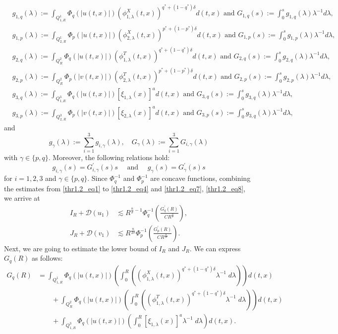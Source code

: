 \documentclass[11pt,reqno]{amsart}
\newcommand{\tron}[1]{\left( #1 \right)}
\numberwithin{equation}{section}
\begin{document}
\begin{align*}
    &g_{1,q}(\lambda):=\int_{Q^1_{1,R}} \Phi_q(|u(t,x)|)\left(\phi^{X}_{1,\lambda}(t,x)\right)^{q^*+(1-q^*)\delta}d(t,x)\text{ and }G_{1,q}(s):=\int_0^s g_{1,q}(\lambda)\lambda^{-1} d \lambda,\\
    &g_{1,p}(\lambda):=\int_{Q^1_{2,R}} \Phi_p(|u(t,x)|)\left(\phi^{X}_{2,\lambda}(t,x)\right)^{p^*+(1-p^*)\delta}d(t,x)\text{ and }G_{1,p}(s):=\int_0^s g_{1,p}(\lambda)\lambda^{-1} d \lambda,\\
    &g_{2,q}(\lambda):=\int_{Q^2_{R}} \Phi_q(|u(t,x)|)\left(\phi^{T}_{1,\lambda}(t,x)\right)^{q^*+(1-q^*)\delta}d(t,x)\text{ and }G_{2,q}(s):=\int_0^s g_{2,q}(\lambda)\lambda^{-1} d \lambda,\\
    &g_{2,p}(\lambda):=\int_{Q^2_{R}} \Phi_p(|v(t,x)|)\left(\phi^{T}_{2,\lambda}(t,x)\right)^{p^*+(1-p^*)\delta}d(t,x)\text{ and }G_{2,p}(s):=\int_0^s g_{2,p}(\lambda)\lambda^{-1} d \lambda,\\
    &g_{3,q}(\lambda):=\int_{Q^3_{1,R}} \Phi_q(|u(t,x)|)[\xi_{1,\lambda}(x)]^{a}d(t,x)\text{ and }G_{3,q}(s):=\int_0^s g_{3,q}(\lambda)\lambda^{-1} d \lambda,\\
    &g_{3,p}(\lambda):=\int_{Q^3_{2,R}} \Phi_p(|v(t,x)|)[\xi_{2,\lambda}(x)]^{a}d(t,x)\text{ and }G_{3,p}(s):=\int_0^s g_{3,q}(\lambda)\lambda^{-1} d \lambda,
\end{align*}
and
\[
g_\gamma(\lambda):=\sum_{i=1}^{3}g_{i,\gamma}(\lambda),\quad G_\gamma(\lambda):=\sum_{i=1}^{3}G_{i,\gamma}(\lambda)
\]
with $\gamma\in \{p,q\}$. Moreover, the following relations hold:
$$
g_{i,\gamma}(s)=G^{\prime}_{i,\gamma}(s)s \quad\text{ and }\quad g_\gamma(s)=G^{\prime}_\gamma(s)s
$$
for $i=1,2,3$ and $\gamma\in \{p,q\}$. Since $\Phi_q^{-1}$ and $\Phi_p^{-1}$ are concave functions, combining the estimates from \eqref{thr1.2_eq1} to \eqref{thr1.2_eq4} and \eqref{thr1.2_eq7}, \eqref{thr1.2_eq8}, we arrive at
\begin{align}
    I_{R}+\mathcal{D}(u_1)&\lesssim R^{\frac{n}{\sigma}-1}\Phi_q^{-1}\tron{\frac{G^{\prime}_q(R)}{CR^{\frac{n}{\sigma}}}},\label{upperIR} \\
    J_{R}+\mathcal{D}(v_1)&\lesssim R^{\frac{n}{2\sigma}}\Phi_p^{-1}\tron{\frac{G^{\prime}_p(R)}{CR^{\frac{n}{2\sigma}}}}\label{upperJR}. 
\end{align}
Next, we are going to estimate the lower bound of $I_R$ and $J_R$. We can express $G_q(R)$ as follows:
\begin{equation}\label{thr1.2_eq9}
\begin{aligned}
G_q(R)&=\int_{Q^1_{1,R}} \Phi_q(|u(t,x)|)\tron{\int_{0}^{R}\tron{\left(\phi^{X}_{1,\lambda}(t,x)\right)^{q^*+(1-q^*)\delta}\lambda^{-1}\;d \lambda}}d(t,x)\\
&\qquad+\int_{Q^2_{R}} \Phi_q(|u(t,x)|)\tron{\int_{0}^{R}\tron{\left(\phi^{T}_{1,\lambda}(t,x)\right)^{q^*+(1-q^*)\delta}\lambda^{-1}\;d \lambda}}d(t,x)\\
&\qquad+\int_{Q^3_{1,R}} \Phi_q(|u(t,x)|)\tron{\int_{0}^{R}[\xi_{1,\lambda}(x)]^{a}\lambda^{-1}\;d \lambda}d(t,x).
\end{aligned}
\end{equation}
\end{document}
